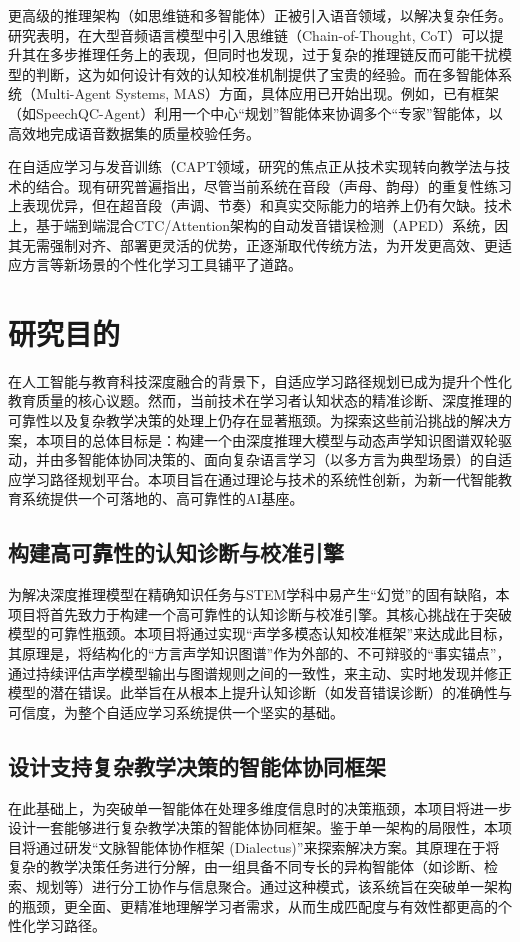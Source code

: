 更高级的推理架构（如思维链和多智能体）正被引入语音领域，以解决复杂任务。研究表明，在大型音频语言模型中引入思维链（Chain-of-Thought, CoT）可以提升其在多步推理任务上的表现，但同时也发现，过于复杂的推理链反而可能干扰模型的判断，这为如何设计有效的认知校准机制提供了宝贵的经验。而在多智能体系统（Multi-Agent Systems, MAS）方面，具体应用已开始出现。例如，已有框架（如SpeechQC-Agent）利用一个中心“规划”智能体来协调多个“专家”智能体，以高效地完成语音数据集的质量校验任务。

在自适应学习与发音训练（CAPT领域，研究的焦点正从技术实现转向教学法与技术的结合。现有研究普遍指出，尽管当前系统在音段（声母、韵母）的重复性练习上表现优异，但在超音段（声调、节奏）和真实交际能力的培养上仍有欠缺。技术上，基于端到端混合CTC/Attention架构的自动发音错误检测（APED）系统，因其无需强制对齐、部署更灵活的优势，正逐渐取代传统方法，为开发更高效、更适应方言等新场景的个性化学习工具铺平了道路。

\section{研究目的}

在人工智能与教育科技深度融合的背景下，自适应学习路径规划已成为提升个性化教育质量的核心议题。然而，当前技术在学习者认知状态的精准诊断、深度推理的可靠性以及复杂教学决策的处理上仍存在显著瓶颈。为探索这些前沿挑战的解决方案，本项目的总体目标是：构建一个由深度推理大模型与动态声学知识图谱双轮驱动，并由多智能体协同决策的、面向复杂语言学习（以多方言为典型场景）的自适应学习路径规划平台。本项目旨在通过理论与技术的系统性创新，为新一代智能教育系统提供一个可落地的、高可靠性的AI基座。

\subsection{构建高可靠性的认知诊断与校准引擎}
为解决深度推理模型在精确知识任务与STEM学科中易产生“幻觉”的固有缺陷，本项目将首先致力于构建一个高可靠性的认知诊断与校准引擎。其核心挑战在于突破模型的可靠性瓶颈。本项目将通过实现“声学多模态认知校准框架”来达成此目标，其原理是，将结构化的“方言声学知识图谱”作为外部的、不可辩驳的“事实锚点”，通过持续评估声学模型输出与图谱规则之间的一致性，来主动、实时地发现并修正模型的潜在错误。此举旨在从根本上提升认知诊断（如发音错误诊断）的准确性与可信度，为整个自适应学习系统提供一个坚实的基础。

\subsection{设计支持复杂教学决策的智能体协同框架}
在此基础上，为突破单一智能体在处理多维度信息时的决策瓶颈，本项目将进一步设计一套能够进行复杂教学决策的智能体协同框架。鉴于单一架构的局限性，本项目将通过研发“文脉智能体协作框架 (Dialectus)”来探索解决方案。其原理在于将复杂的教学决策任务进行分解，由一组具备不同专长的异构智能体（如诊断、检索、规划等）进行分工协作与信息聚合。通过这种模式，该系统旨在突破单一架构的瓶颈，更全面、更精准地理解学习者需求，从而生成匹配度与有效性都更高的个性化学习路径。

